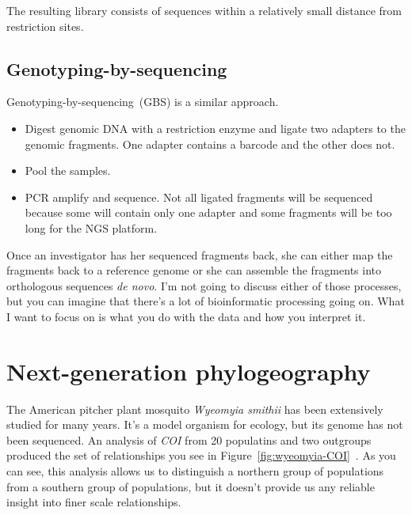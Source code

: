 \documentclass[12pt]{article}
\begin{document}
The resulting library consists of sequences within a relatively small
distance from restriction sites. 

\subsection*{Genotyping-by-sequencing}

Genotyping-by-sequencing~(GBS) is a similar approach. 

\begin{itemize}

\item Digest genomic DNA with a restriction enzyme and ligate two
  adapters to the genomic fragments. One adapter contains a barcode
  and the other does not.

\item Pool the samples.

\item PCR amplify and sequence. Not all ligated fragments will be
  sequenced because some will contain only one adapter and some
  fragments will be too long for the NGS platform.

\end{itemize}

Once an investigator has her sequenced fragments back, she can either
map the fragments back to a reference genome or she can assemble the
fragments into orthologous sequences {\it de novo}. I'm not going to
discuss either of those processes, but you can imagine that there's a
lot of bioinformatic processing going on. What I want to focus on is
what you do with the data and how you interpret it.

\section*{Next-generation phylogeography}

The American pitcher plant mosquito {\it Wyeomyia
  smithii\/} has been extensively studied for many years. It's a model
organism for ecology, but its genome has not been sequenced. An
analysis of {\it COI} from 20 populatins and two outgroups produced
the set of relationships you see in
Figure~\ref{fig:wyeomyia-COI}~\cite{Emerson-etal-2010}.
As you can see, this analysis allows us to distinguish a northern
group of populations from a southern group of populations, but it
doesn't provide us any reliable insight into finer scale
relationships. 
\end{document}
